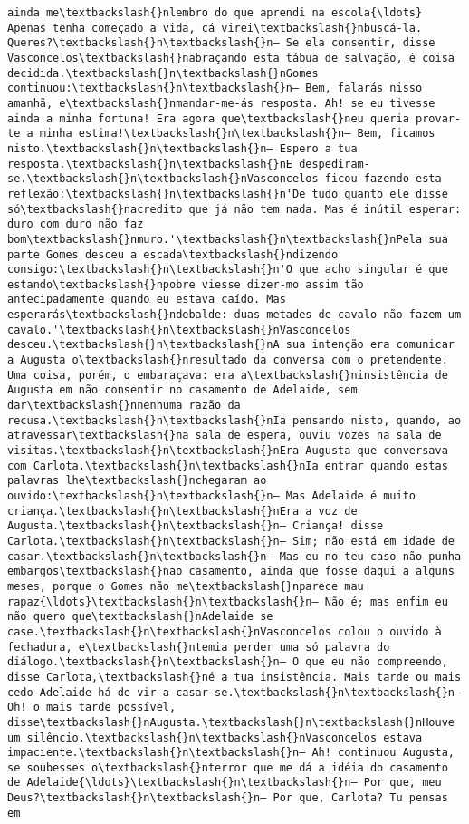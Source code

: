 \documentclass[11pt]{article}
\begin{document}
\begin{Verbatim}[commandchars=\\\{\}]
ainda me\textbackslash{}nlembro do que aprendi na escola{\ldots} Apenas tenha começado a vida, cá virei\textbackslash{}nbuscá-la. Queres?\textbackslash{}n\textbackslash{}n— Se ela consentir, disse Vasconcelos\textbackslash{}nabraçando esta tábua de salvação, é coisa decidida.\textbackslash{}n\textbackslash{}nGomes continuou:\textbackslash{}n\textbackslash{}n— Bem, falarás nisso amanhã, e\textbackslash{}nmandar-me-ás resposta. Ah! se eu tivesse ainda a minha fortuna! Era agora que\textbackslash{}neu queria provar-te a minha estima!\textbackslash{}n\textbackslash{}n— Bem, ficamos nisto.\textbackslash{}n\textbackslash{}n— Espero a tua resposta.\textbackslash{}n\textbackslash{}nE despediram-se.\textbackslash{}n\textbackslash{}nVasconcelos ficou fazendo esta reflexão:\textbackslash{}n\textbackslash{}n'De tudo quanto ele disse só\textbackslash{}nacredito que já não tem nada. Mas é inútil esperar: duro com duro não faz bom\textbackslash{}nmuro.'\textbackslash{}n\textbackslash{}nPela sua parte Gomes desceu a escada\textbackslash{}ndizendo consigo:\textbackslash{}n\textbackslash{}n'O que acho singular é que estando\textbackslash{}npobre viesse dizer-mo assim tão antecipadamente quando eu estava caído. Mas esperarás\textbackslash{}ndebalde: duas metades de cavalo não fazem um cavalo.'\textbackslash{}n\textbackslash{}nVasconcelos desceu.\textbackslash{}n\textbackslash{}nA sua intenção era comunicar a Augusta o\textbackslash{}nresultado da conversa com o pretendente. Uma coisa, porém, o embaraçava: era a\textbackslash{}ninsistência de Augusta em não consentir no casamento de Adelaide, sem dar\textbackslash{}nnenhuma razão da recusa.\textbackslash{}n\textbackslash{}nIa pensando nisto, quando, ao atravessar\textbackslash{}na sala de espera, ouviu vozes na sala de visitas.\textbackslash{}n\textbackslash{}nEra Augusta que conversava com Carlota.\textbackslash{}n\textbackslash{}nIa entrar quando estas palavras lhe\textbackslash{}nchegaram ao ouvido:\textbackslash{}n\textbackslash{}n— Mas Adelaide é muito criança.\textbackslash{}n\textbackslash{}nEra a voz de Augusta.\textbackslash{}n\textbackslash{}n— Criança! disse Carlota.\textbackslash{}n\textbackslash{}n— Sim; não está em idade de casar.\textbackslash{}n\textbackslash{}n— Mas eu no teu caso não punha embargos\textbackslash{}nao casamento, ainda que fosse daqui a alguns meses, porque o Gomes não me\textbackslash{}nparece mau rapaz{\ldots}\textbackslash{}n\textbackslash{}n— Não é; mas enfim eu não quero que\textbackslash{}nAdelaide se case.\textbackslash{}n\textbackslash{}nVasconcelos colou o ouvido à fechadura, e\textbackslash{}ntemia perder uma só palavra do diálogo.\textbackslash{}n\textbackslash{}n— O que eu não compreendo, disse Carlota,\textbackslash{}né a tua insistência. Mais tarde ou mais cedo Adelaide há de vir a casar-se.\textbackslash{}n\textbackslash{}n— Oh! o mais tarde possível, disse\textbackslash{}nAugusta.\textbackslash{}n\textbackslash{}nHouve um silêncio.\textbackslash{}n\textbackslash{}nVasconcelos estava impaciente.\textbackslash{}n\textbackslash{}n— Ah! continuou Augusta, se soubesses o\textbackslash{}nterror que me dá a idéia do casamento de Adelaide{\ldots}\textbackslash{}n\textbackslash{}n— Por que, meu Deus?\textbackslash{}n\textbackslash{}n— Por que, Carlota? Tu pensas em 
\end{Verbatim}
\end{document}
